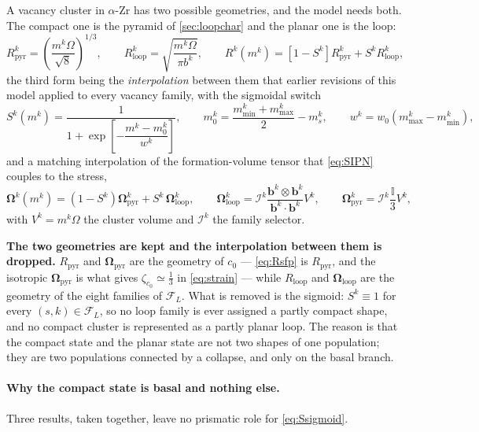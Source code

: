 \documentclass{article}
\newcommand{\bvec}{\bm b}
\begin{document}
A vacancy cluster in $\alpha$-Zr has two possible geometries, and the model needs
both. The compact one is the pyramid of \cref{sec:loopchar} and the planar one is
the loop:
\begin{equation}
  R^k_{\mathrm{pyr}}=\left(\frac{m^k\Omega}{\sqrt8}\right)^{1/3},
  \qquad
  R^k_{\mathrm{loop}}=\sqrt{\frac{m^k\Omega}{\pi b^k}},
  \qquad
  R^k(m^k)=\left[1-S^k\right]R^k_{\mathrm{pyr}}+S^k R^k_{\mathrm{loop}} ,
  \label{eq:Rtransition}
\end{equation}
the third form being the \emph{interpolation} between them that earlier revisions
of this model applied to every vacancy family, with the sigmoidal switch
\begin{equation}
  S^k(m^k)=\frac{1}{1+\exp\left[-\dfrac{m^k-m^k_0}{w^k}\right]},
  \qquad
  m^k_0=\frac{m^k_{\min}+m^k_{\max}}{2}-m^k_s,
  \qquad
  w^k=w_0\left(m^k_{\max}-m^k_{\min}\right),
  \label{eq:Ssigmoid}
\end{equation}
and a matching interpolation of the formation-volume tensor that \cref{eq:SIPN}
couples to the stress,
\begin{equation}
  \bm\Omega^k(m^k)=\left(1-S^k\right)\bm\Omega^k_{\mathrm{pyr}}
                   +S^k\,\bm\Omega^k_{\mathrm{loop}},
  \qquad
  \bm\Omega^k_{\mathrm{loop}}=\mathcal I^k\frac{\bvec^k\otimes\bvec^k}
                                             {\bvec^k\cdot\bvec^k}V^k,
  \qquad
  \bm\Omega^k_{\mathrm{pyr}}=\mathcal I^k\frac{\mathbb I}{3}V^k,
  \label{eq:Omegatransition}
\end{equation}
with $V^k=m^k\Omega$ the cluster volume and $\mathcal I^k$ the family selector.

\textbf{The two geometries are kept and the interpolation between them is
dropped.} $R_{\mathrm{pyr}}$ and $\bm\Omega_{\mathrm{pyr}}$ are the geometry of
$c_0$ --- \cref{eq:Rsfp} is $R_{\mathrm{pyr}}$, and the isotropic
$\bm\Omega_{\mathrm{pyr}}$ is what gives $\zeta_{c_0}\simeq\tfrac13$ in
\cref{eq:strain} --- while $R_{\mathrm{loop}}$ and $\bm\Omega_{\mathrm{loop}}$ are
the geometry of the eight families of $\mathcal F_L$. What is removed is the
sigmoid: $S^k\equiv1$ for every $(s,k)\in\mathcal F_L$, so no loop family is ever
assigned a partly compact shape, and no compact cluster is represented as a
partly planar loop. The reason is that the compact state and the planar state are
not two shapes of one population; they are two populations connected by a
collapse, and only on the basal branch.

\paragraph{Why the compact state is basal and nothing else.} Three results, taken
together, leave no prismatic role for \cref{eq:Ssigmoid}.
\end{document}

